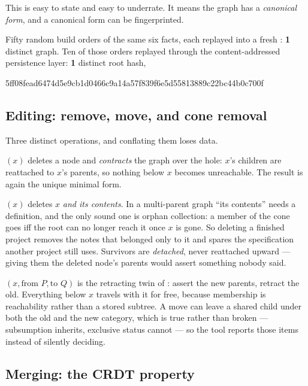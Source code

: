 This is easy to state and easy to underrate. It means the graph has a
\emph{canonical form}, and a canonical form can be fingerprinted.

\begin{measured}
Fifty random build orders of the same six facts, each replayed into a fresh
\odag{}: \textbf{1} distinct graph. Ten of those orders replayed through the
content-addressed persistence layer: \textbf{1} distinct root hash,
\begin{center}\ttfamily\footnotesize
5ff08fead6474d5e9cb1d0466c9a14a57f839f6e5d55813889c22bc44b0c700f
\end{center}
\end{measured}

\subsection{Editing: remove, move, and cone removal}

Three distinct operations, and conflating them loses data.

$(x)$ deletes a node and \emph{contracts} the graph over the hole:
$x$'s children are reattached to $x$'s parents, so nothing below $x$ becomes
unreachable. The result is again the unique minimal form.

$(x)$ deletes $x$ \emph{and its contents}. In a
multi-parent graph ``its contents'' needs a definition, and the only sound one
is orphan collection: a member of the cone goes iff the root can no longer
reach it once $x$ is gone. So deleting a finished project removes the notes
that belonged only to it and spares the specification another project still
uses. Survivors are \emph{detached}, never reattached upward --- giving them
the deleted node's parents would assert something nobody said.

$(x, \text{from } P, \text{to } Q)$ is the retracting twin of
: assert the new parents, retract the old. Everything below $x$
travels with it for free, because membership is reachability rather than a
stored subtree. A move can leave a shared child under both the old and the new
category, which is true rather than broken --- subsumption inherits, exclusive
status cannot --- so the tool reports those items instead of silently
deciding.

\subsection{Merging: the CRDT property}
\label{sec:merge}


